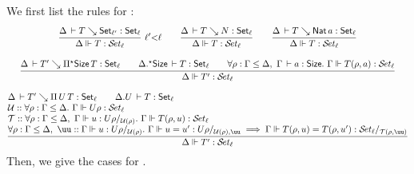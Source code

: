 \documentclass[acmlarge,review,anonymous]{acmart}\settopmatter{printfolios=true}
\begin{document}
We first list the rules for :
\begin{gather*}
  \rux{\Delta \der T \evalsto \Set[\ell'] : \Set[\ell]
     }{\sty \Delta T \ell
     }{\ell' {<} \ell}
\qquad
  \ru{\Delta \der T \evalsto N : \Set[\ell]
    }{\sty \Delta T \ell}
\qquad
  \ru{\Delta \der T \evalsto \Nat a : \Set[\ell]
    }{\sty \Delta T \ell}
\\[2ex]
  \rul{\Delta \der T' \evalsto \epiT \Size T : \Set[\ell] \qquad
       \eext \Delta \Size \der T : \Set[\ell] \qquad
      \forall \rho : \Gamma \leq \Delta,~\Gamma \der a : \Size.~
        \sty \Gamma {T(\rho,a)} \ell \\
    }{\sty \Delta {T'} \ell}
\\[2ex]
  \rul{\Delta \der T' \evalsto \piT U T : \Set[\ell] \qquad \cext \Delta U \der T : \Set[\ell] \\ \relax
      \U :: \forall \rho : \Gamma \leq \Delta.~ \sty{\Gamma}{U\rho} {\ell} \\ \relax
      \T :: \forall \rho : \Gamma \leq \Delta,~\sttmd \Gamma u {U\rho} {\U(\rho)}.~
        \sty \Gamma {T(\rho,u)} \ell \\
      \forall \rho : \Gamma \leq \Delta,~ \uu :: \sttmd \Gamma u {U\rho} {\U(\rho)}.~
        \sttmeqd \Gamma u {u'} {U\rho} {\U(\rho)} {\uu} \implies
        \steqd \Gamma {T(\rho,u)} {T(\rho,u')} \ell {\T(\rho,\uu)}
    }{\sty \Delta {T'} \ell}
\end{gather*}
Then, we give the cases for .
\end{document}
